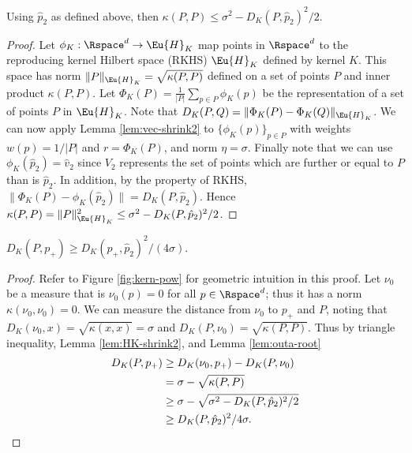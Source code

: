 \documentclass[11pt]{myclass}
\begin{document}
\begin{lemma}
\label{lem:HK-shrink2}
Using $\hat p_2$ as defined above, then
$\kappa(P,P) \leq \sigma^2 - D_K(P,\hat p_2)^2/2$.
\end{lemma}
\begin{proof}
Let $\phi_K : \Rspace^d \to \Eu{H}_K$ map points in $\Rspace^d$ to the reproducing kernel Hilbert space (RKHS) $\Eu{H}_K$ defined by kernel $K$.  This space has norm $\|P\|_{\Eu{H}_K} = \sqrt{\kappa(P,P)}$ defined on a set of points $P$ and inner product $\kappa(P,P)$.  Let $\Phi_K(P) = \frac{1}{|P|}\sum_{p \in P} \phi_K(p)$ be the representation of a set of points $P$ in $\Eu{H}_K$.  
Note that $D_K(P,Q) = \|\Phi_K(P) - \Phi_K(Q)\|_{\Eu{H}_K}$.  
We can now apply Lemma \ref{lem:vec-shrink2} to $\{\phi_K(p)\}_{p \in P}$ with weights $w(p) = 1/|P|$ and $r = \Phi_K(P)$, and norm $\eta = \sigma$.  
Finally note that we can use $\phi_K(\hat p_2) = \hat v_2$ since $V_2$ represents the set of points which are further or equal to $P$ than is $\hat p_2$.   
In addition, by the property of RKHS, $\| \Phi_K(P) - \phi_K(\hat p_2) \| = D_K(P, \hat p_2)$. 
Hence
$\kappa(P,P) = \|P\|_{\Eu{H}_K}^2 \leq \sigma^2 - D_K(P,\hat p_2)^2/2$.
\end{proof}





\begin{lemma}
\label{lem:sq-bnd2}
$D_K(P,p_+) \geq D_K(p_+,\hat p_2)^2/(4\sigma)$.  
\end{lemma}
\begin{proof}
Refer to Figure \ref{fig:kern-pow} for geometric intuition in this proof.  
Let $\nu_0$ be a measure that is $\nu_0(p) = 0$ for all $p \in \Rspace^d$; thus it has a norm $\kappa(\nu_0, \nu_0) = 0$.  
We can measure the distance from $\nu_0$ to $p_+$ and $P$, noting that $D_K(\nu_0,x) = \sqrt{\kappa(x,x)} = \sigma$ and $D_K(P,\nu_0) = \sqrt{\kappa(P,P)}$.  Thus by triangle inequality, Lemma \ref{lem:HK-shrink2}, and Lemma \ref{lem:outa-root} 
\begin{align*}
D_K(P,p_+) 
& \geq 
D_K(\nu_0, p_+) - D_K(P, \nu_0) 
\\ &= 
\sigma - \sqrt{\kappa(P,P)}
\\ &\geq
\sigma - \sqrt{\sigma^2 - D_K(P,\hat p_2)^2/2} 
\\ & \geq
D_K(P,\hat p_2)^2/4\sigma.  \qedhere
\end{align*}
\end{proof}
\end{document}
